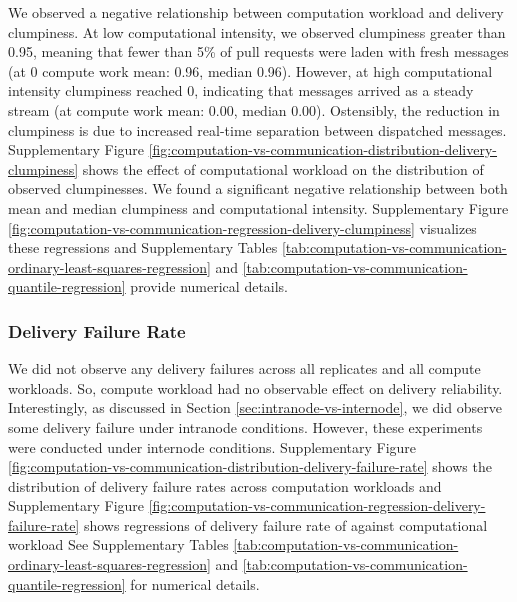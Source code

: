We observed a negative relationship between computation workload and delivery clumpiness.
At low computational intensity, we observed clumpiness greater than 0.95, meaning that fewer than 5\% of pull requests were laden with fresh messages (at 0 compute work mean: 0.96, median 0.96).
However, at high computational intensity clumpiness reached 0, indicating that messages arrived as a steady stream (at  compute work mean: 0.00, median 0.00).
Ostensibly, the reduction in clumpiness is due to increased real-time separation between dispatched messages.
Supplementary Figure \ref{fig:computation-vs-communication-distribution-delivery-clumpiness} shows the effect of computational workload on the distribution of observed clumpinesses.
We found a significant negative relationship between both mean and median clumpiness and computational intensity.
Supplementary Figure \ref{fig:computation-vs-communication-regression-delivery-clumpiness} visualizes these regressions and Supplementary Tables \ref{tab:computation-vs-communication-ordinary-least-squares-regression} and \ref{tab:computation-vs-communication-quantile-regression} provide numerical details.

\subsubsection{Delivery Failure Rate}

We did not observe any delivery failures across all replicates and all compute workloads.
So, compute workload had no observable effect on delivery reliability.
Interestingly, as discussed in Section \ref{sec:intranode-vs-internode}, we did observe some delivery failure under intranode conditions.
However, these experiments were conducted under internode conditions.
Supplementary Figure \ref{fig:computation-vs-communication-distribution-delivery-failure-rate} shows the distribution of delivery failure rates across computation workloads and Supplementary Figure \ref{fig:computation-vs-communication-regression-delivery-failure-rate} shows regressions of delivery failure rate of against computational workload
See Supplementary Tables \ref{tab:computation-vs-communication-ordinary-least-squares-regression} and \ref{tab:computation-vs-communication-quantile-regression} for numerical details.
